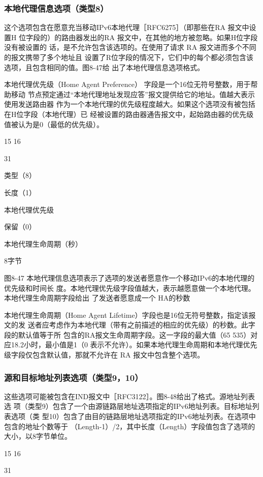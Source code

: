 \subsubsection{本地代理信息选项（类型8）}
这个选项包含在愿意充当移动IPv6本地代理［RFC6275］（即那些在RA 报文中设置H
位字段的）的路由器发出的RA 报文中，在其他的地方被忽略。如果H位字段没有被设置的
话，是不允许包含该选项的。在使用了请求 RA 报文进而多个不同的报文携带了多个地址且
设置了R位字段的情况下，它们中的每个都必须包含该选项，且包含相同的值。图8-47给
出了本地代理信息选项格式。

本地代理优先级（Home Agent Preference） 字段是一个16位无符号整数，用于帮助移动
节点预定通过“本地代理地址发现应答”报文提供给它的地址。值越大表示使用发送路由器
作为一个本地代理的优先级程度越大。如果这个选项没有被包括在H位字段（本地代理）已
经被设置的路由器通告报文中，起始路由器的优先级值被认为是0（最低的优先级）。

15 16

31

类型（8）

长度（1）

本地代理优先级

保留（0）

本地代理生命周期（秒）

8字节

图8-47 本地代理信息选项表示了选项的发送者愿意作一个移动IPv6的本地代理的优先级和时间长
度。本地代理优先级字段值越大，表示越愿意做一个本地代理。本地代理生命周期字段给出
了发送者愿意成一个 HA的秒数

本地代理生命周期（Home Agent Lifetime）字段也是16位无符号整数，指定该报文的发
送者应考虑作为本地代理（带有之前描述的相应的优先级）的秒数。此字段的默认值等于所
包含的RA报文生命周期字段。这一字段的最大值（65 535）对应18.2小时，最小值是1（0
表示不允许）。如果本地代理生命周期和本地代理优先级字段仅包含默认值，那就不允许在
RA 报文中包含整个选项。

\subsubsection{源和目标地址列表选项（类型9，10）}
这些选项可能被包含在IND报文中［RFC3122］。图8-48给出了格式。源地址列表选
项（类型9）包含了一个由源链路层地址选项指定的IPv6地址列表。目标地址列表选项（类
型10）包含了由目的链路层地址选项指定的IPv6地址列表。在选项中包含的地址个数等于
（Length-1）/2，其中长度（Length）字段值包含了选项的大小，以8字节单位。

15 16

31

